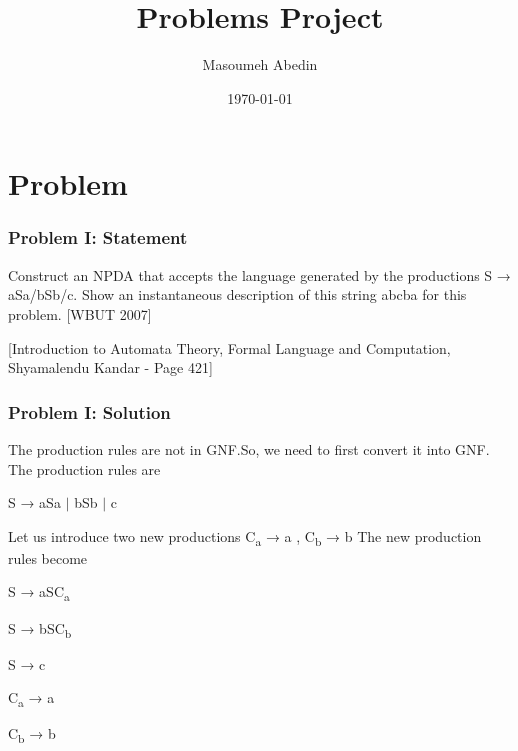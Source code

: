 \documentclass{beamer}
\title[ma.abedin90@gmail.com]{Problems Project} %
\author{Masoumeh Abedin} %
\institute[PNU] %
{
	Payam Nour University \\ %
	\medskip
	
	\textbf{Theory of Languages and Machine}
	\newline
	\textbf{Dr Ali Razavi}
}
\date{\today} %
\begin{document}
	
	\begin{frame}
		\titlepage %
	\end{frame}
		
	
	\section{Problem} %
	
	
	\begin{frame}
		\frametitle{Problem I: Statement}
		Construct an NPDA that accepts the language generated by the productions S → aSa/bSb/c. Show an instantaneous description of this string abcba for this problem. [WBUT 2007]
		
		[Introduction to Automata Theory, Formal Language and Computation, Shyamalendu Kandar - Page 421]
	\end{frame}
	
	
	\begin{frame}[fragile] %
		\frametitle{Problem I: Solution}

			The production rules are not in GNF.So, we need to first convert it into GNF. The production rules are
			\begin{center}
			S → aSa $\vert$ bSb $\vert$  c
			\end{center}


			Let us introduce two new productions  C\textsubscript{a} → a , C\textsubscript{b} → b
			The new production rules become
			\begin{center}
				S → aSC\textsubscript{a}
			\end{center}
			\begin{center}
				S → bSC\textsubscript{b}
			\end{center}
			\begin{center}
				S → c		
			\end{center}
			\begin{center}
				C\textsubscript{a} → a
			\end{center}
			\begin{center}
				C\textsubscript{b} → b
			\end{center}
	\end{frame}
\end{document}
